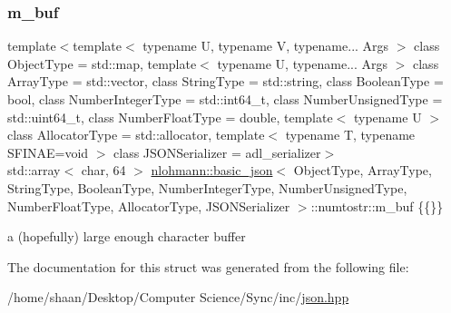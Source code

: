 \subsubsection{\texorpdfstring{m\+\_\+buf}{m\_buf}}
{\footnotesize\ttfamily template$<$template$<$ typename U, typename V, typename... Args $>$ class Object\+Type = std\+::map, template$<$ typename U, typename... Args $>$ class Array\+Type = std\+::vector, class String\+Type  = std\+::string, class Boolean\+Type  = bool, class Number\+Integer\+Type  = std\+::int64\+\_\+t, class Number\+Unsigned\+Type  = std\+::uint64\+\_\+t, class Number\+Float\+Type  = double, template$<$ typename U $>$ class Allocator\+Type = std\+::allocator, template$<$ typename T, typename S\+F\+I\+N\+A\+E=void $>$ class J\+S\+O\+N\+Serializer = adl\+\_\+serializer$>$ \\
std\+::array$<$ char, 64 $>$ \hyperlink{classnlohmann_1_1basic__json}{nlohmann\+::basic\+\_\+json}$<$ Object\+Type, Array\+Type, String\+Type, Boolean\+Type, Number\+Integer\+Type, Number\+Unsigned\+Type, Number\+Float\+Type, Allocator\+Type, J\+S\+O\+N\+Serializer $>$\+::numtostr\+::m\+\_\+buf \{\{\}\}\hspace{0.3cm}{\ttfamily [private]}}



a (hopefully) large enough character buffer 



The documentation for this struct was generated from the following file\+:\begin{DoxyCompactItemize}
\item 
/home/shaan/\+Desktop/\+Computer Science/\+Sync/inc/\hyperlink{json_8hpp}{json.\+hpp}\end{DoxyCompactItemize}
